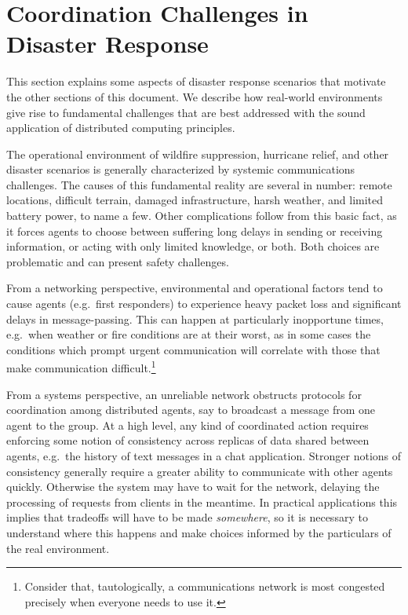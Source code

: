 \documentclass[]             %
{NASA}                       %
\theoremstyle{definition}
\begin{document}
\newpage

\hypertarget{coordination-challenges-in-disaster-response}{%
\section{Coordination Challenges in Disaster
Response}\label{coordination-challenges-in-disaster-response}}

\label{sec:disaster-response}

This section explains some aspects of disaster response scenarios that
motivate the other sections of this document. We describe how real-world
environments give rise to fundamental challenges that are best addressed
with the sound application of distributed computing principles.

The operational environment of wildfire suppression, hurricane relief,
and other disaster scenarios is generally characterized by systemic
communications challenges. The causes of this fundamental reality are
several in number: remote locations, difficult terrain, damaged
infrastructure, harsh weather, and limited battery power, to name a few.
Other complications follow from this basic fact, as it forces agents to
choose between suffering long delays in sending or receiving
information, or acting with only limited knowledge, or both. Both
choices are problematic and can present safety challenges.

From a networking perspective, environmental and operational factors
tend to cause agents (e.g.~first responders) to experience heavy packet
loss and significant delays in message-passing. This can happen at
particularly inopportune times, e.g.~when weather or fire conditions are
at their worst, as in some cases the conditions which prompt urgent
communication will correlate with those that make communication
difficult.\footnote{Consider that, tautologically, a communications
  network is most \mbox{congested} precisely when everyone needs to use
  it.}

From a systems perspective, an unreliable network obstructs protocols
for coordination among distributed agents, say to broadcast a message
from one agent to the group. At a high level, any kind of coordinated
action requires enforcing some notion of consistency across replicas of
data shared between agents, e.g.~the history of text messages in a chat
application. Stronger notions of consistency generally require a greater
ability to communicate with other agents quickly. Otherwise the system
may have to wait for the network, delaying the processing of requests
from clients in the meantime. In practical applications this implies
that tradeoffs will have to be made \emph{somewhere}, so it is necessary
to understand where this happens and make choices informed by the
particulars of the real environment.
\end{document}
